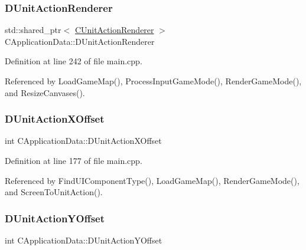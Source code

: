 \subsubsection{\texorpdfstring{D\+Unit\+Action\+Renderer}{DUnitActionRenderer}}
{\footnotesize\ttfamily std\+::shared\+\_\+ptr$<$ \hyperlink{classCUnitActionRenderer}{C\+Unit\+Action\+Renderer} $>$ C\+Application\+Data\+::\+D\+Unit\+Action\+Renderer\hspace{0.3cm}{\ttfamily [protected]}}



Definition at line 242 of file main.\+cpp.



Referenced by Load\+Game\+Map(), Process\+Input\+Game\+Mode(), Render\+Game\+Mode(), and Resize\+Canvases().

\hypertarget{classCApplicationData_aa47b53d283617575a4866c08d83e27c4}{}\label{classCApplicationData_aa47b53d283617575a4866c08d83e27c4} 
\subsubsection{\texorpdfstring{D\+Unit\+Action\+X\+Offset}{DUnitActionXOffset}}
{\footnotesize\ttfamily int C\+Application\+Data\+::\+D\+Unit\+Action\+X\+Offset\hspace{0.3cm}{\ttfamily [protected]}}



Definition at line 177 of file main.\+cpp.



Referenced by Find\+U\+I\+Component\+Type(), Load\+Game\+Map(), Render\+Game\+Mode(), and Screen\+To\+Unit\+Action().

\hypertarget{classCApplicationData_a8ccfb55bd25cba0e6eb66573ba9c8b3c}{}\label{classCApplicationData_a8ccfb55bd25cba0e6eb66573ba9c8b3c} 
\subsubsection{\texorpdfstring{D\+Unit\+Action\+Y\+Offset}{DUnitActionYOffset}}
{\footnotesize\ttfamily int C\+Application\+Data\+::\+D\+Unit\+Action\+Y\+Offset\hspace{0.3cm}{\ttfamily [protected]}}



